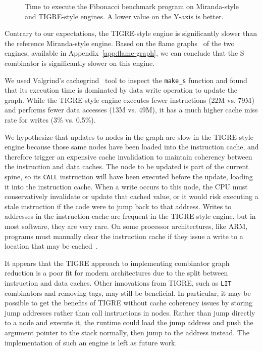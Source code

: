 \documentclass[conference]{IEEEtran}
\begin{document}
\begin{figure}
    
    \centering
    \caption{
        Time to execute the Fibonacci benchmark program on Miranda-style and TIGRE-style engines.
        A lower value on the Y-axis is better.}
    \label{fig:turner-vs-tigre}
\end{figure}

Contrary to our expectations, the TIGRE-style engine is significantly slower than the reference Miranda-style engine.
Based on the flame graphs~\cite{gregg_flame_2016} of the two engines, available in Appendix~\ref{app:flame-graph}, we can conclude that the S combinator is significantly slower on this engine.

We used Valgrind's cachegrind~\cite{NethercotePhd2004} tool to inspect the \texttt{make\_s} function and found that its execution time is dominated by data write operation to update the graph.
While the TIGRE-style engine executes fewer instructions (22M vs. 79M) and performs fewer data accesses (13M vs. 49M), it has a much higher cache miss rate for writes (3\% vs. 0.5\%).

We hypothesize that updates to nodes in the graph are slow in the TIGRE-style engine because those same nodes have been loaded into the instruction cache, and therefore trigger an expensive cache invalidation to maintain coherency between the instruction and data caches.
The node to be updated is part of the current spine, so its \texttt{CALL} instruction will have been executed before the update, loading it into the instruction cache.
When a write occurs to this node, the CPU must conservatively invalidate or update that cached value, or it would risk executing a stale instruction if the code were to jump back to that address.
Writes to addresses in the instruction cache are frequent in the TIGRE-style engine, but in most software, they are very rare.
On some processor architectures, like ARM, programs must manually clear the instruction cache if they issue a write to a location that may be cached~\cite{bramley_caches_2013}.

It appears that the TIGRE approach to implementing combinator graph reduction is a poor fit for modern architectures due to the split between instruction and data caches.
Other innovations from TIGRE, such as \texttt{LIT} combinators and removing tags, may still be beneficial.
In particular, it may be possible to get the benefits of TIGRE without cache coherency issues by storing jump addresses rather than call instructions in nodes.
Rather than jump directly to a node and execute it, the runtime could load the jump address and push the argument pointer to the stack normally, then jump to the address instead.
The implementation of such an engine is left as future work.
\end{document}
